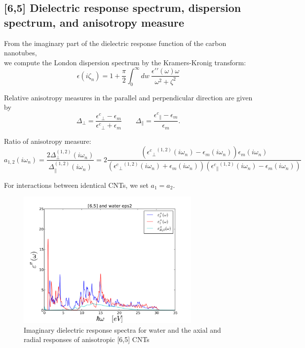 \documentclass[a4paper]{article}
\begin{document}
\subsection{[6,5] Dielectric response spectrum, dispersion spectrum, and anisotropy measure}
\begin{center}
    From the imaginary part of the dielectric response function of the carbon
nanotubes, \\we compute the London dispersion spectrum by the Kramers-Kronig
transform:
\begin{equation}
\epsilon(i \zeta_n) = 1 + \frac{\pi}{2} \int_0^{\infty} dw
~\frac{\epsilon\prime\prime(\omega)\omega}{\omega^{2} + \zeta^{2}}
\end{equation}

Relative anisotropy measures in the parallel and perpendicular direction are given by
\begin{equation}
\Delta_{\perp}=\frac{{\epsilon^{c}}_{\perp}-\epsilon_{m}}{{\epsilon^{c}}_{\perp}+\epsilon_{m}}\qquad\Delta_{\parallel}=\frac{{\epsilon^{c}}_{\parallel}-\epsilon_{m}}{\epsilon_{m}}.
\label{anisoind}
\end{equation}

Ratio of anisotropy measure:
\begin{equation}
a_{1,2}(i \omega_n) = \frac{2 \Delta_{\perp}^{(1,2)}(i\omega_n)}{\Delta_{\parallel}^{(1,2)}(i \omega_n)} = 
2 \frac{({{\epsilon^{c}}_{\perp}}^{(1,2)}(i \omega_n) -\epsilon_{m}(i \omega_n)) \epsilon_{m}(i \omega_n)}{({{\epsilon^{c}}_{\perp}}^{(1,2)}(i \omega_n)+\epsilon_{m}(i \omega_n)) ({{\epsilon^{c}}_{\parallel}}^{(1,2)}(i \omega_n) -\epsilon_{m}(i \omega_n))}
\label{eq:adef}
\end{equation}

For interactions between identical CNTs, we set $a_{1}=a_{2}$.  

\begin{figure}[t!]
\begin{center}
\includegraphics[width=0.8\textwidth]{prop_plots/65w65_eps2.png}
\hskip 43pt
\caption{Imaginary dielectric response spectra for water and the axial and
    radial responses of anisotropic [6,5] CNTs} 
\label{eiz65}
\end{center}
\end{figure} 


\end{center}
\end{document}
